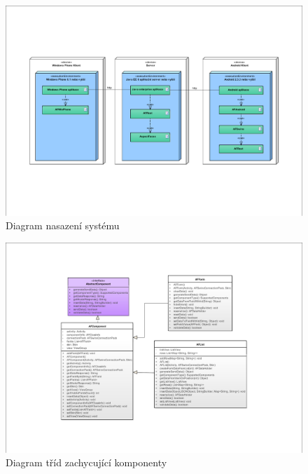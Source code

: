 \begin{figure}
\begin{center}
\includegraphics[width=\textheight, height=\textwidth, keepaspectratio, angle=270]{figures/deploymentDiagram}
\caption{Diagram nasazení systému}
\label{img:deploymentDiagram}
\end{center}
\end{figure}

\begin{figure}
\begin{center}
\includegraphics[width=\textheight, height=\textwidth, keepaspectratio, angle=270]{figures/classDiagramComponents}
\caption{Diagram tříd zachycující komponenty}
\label{img:classDiagramComponents}
\end{center}
\end{figure}

